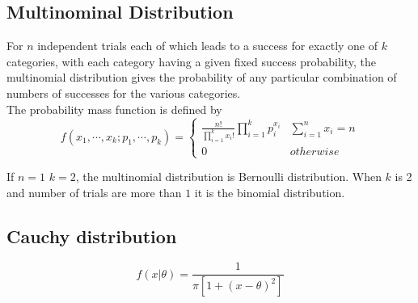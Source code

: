 \documentclass[11pt]{article}
\begin{document}
\subsection*{Multinominal Distribution}

\begin{defn*}
  For $n$ independent trials each of which leads to a success for exactly one of $k$ categories, with each category having a given fixed success probability, the multinomial distribution gives the probability of any particular combination of numbers of successes for the various categories.\\
  The probability mass function is defined by
  \[
    f(x_1, \cdots, x_k; p_1, \cdots, p_k) =
    \begin{cases}
      \frac{n!}{\prod_{i=1}^k x_i!} \prod_{i=1}^k p_i^{x_i} & \sum_{i=1}^n x_i = n\\
      0 & otherwise
    \end{cases}
  \]
  \begin{rem}
    If $n=1$ $k=2$, the multinomial distribution is Bernoulli distribution. When $k$ is 2 and number of trials are more than $1$ it is the binomial distribution.
  \end{rem}
\end{defn*}

\subsection*{Cauchy distribution}

\begin{defn*}
  \[
    f(x|\theta) = \frac{1}{\pi [ 1 + (x-\theta)^2]}
  \]
\end{defn*}
\end{document}
